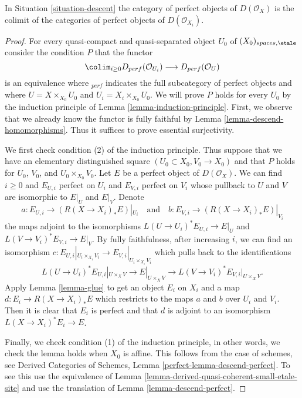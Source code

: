 \begin{lemma}
\label{lemma-perfect-on-limit}
In Situation \ref{situation-descent} the category of perfect
objects of $D(\mathcal{O}_X)$ is the colimit of the categories
of perfect objects of $D(\mathcal{O}_{X_i})$.
\end{lemma}

\begin{proof}
For every quasi-compact and quasi-separated object $U_0$ of
$(X_0)_{spaces, \etale}$ consider the condition $P$ that
the functor
$$
\colim_{i \geq 0} D_{perf}(\mathcal{O}_{U_i})
\longrightarrow
D_{perf}(\mathcal{O}_U)
$$
is an equivalence where ${}_{perf}$ indicates the full subcategory of
perfect objects and where $U = X \times_{X_0} U_0$ and
$U_i = X_i \times_{X_0} U_0$. We will prove $P$ holds for every $U_0$
by the induction principle of Lemma \ref{lemma-induction-principle}.
First, we observe that we already know the functor is fully faithful
by Lemma \ref{lemma-descend-homomorphisms}. Thus it suffices to prove
essential surjectivity.

\medskip\noindent
We first check condition (2) of the induction principle. Thus suppose
that we have an elementary distinguished square
$(U_0 \subset X_0, V_0 \to X_0)$ and that $P$ holds for
$U_0$, $V_0$, and $U_0 \times_{X_0} V_0$. Let $E$ be a perfect object
of $D(\mathcal{O}_X)$. We can find $i \geq 0$ and $E_{U, i}$ perfect on $U_i$
and $E_{V, i}$ perfect on $V_i$ whose pullback to $U$ and $V$ are isomorphic
to $E|_U$ and $E|_V$. Denote
$$
a : E_{U, i} \to (R(X \to X_i)_*E)|_{U_i}
\quad\text{and}\quad
b : E_{V, i} \to (R(X \to X_i)_*E)|_{V_i}
$$
the maps adjoint to the isomorphisms $L(U \to U_i)^*E_{U, i} \to E|_U$
and $L(V \to V_i)^*E_{V, i} \to E|_V$. By fully faithfulness, after
increasing $i$, we can find an isomorphism
$c : E_{U, i}|_{U_i \times_{X_i} V_i} \to E_{V, i}|_{U_i \times_{X_i} V_i}$
which pulls back to the identifications 
$$
L(U \to U_i)^*E_{U, i}|_{U \times_X V} \to E|_{U \times_X V} \to
L(V \to V_i)^*E_{V, i}|_{U \times_X V}.
$$
Apply Lemma \ref{lemma-glue}
to get an object $E_i$ on $X_i$ and a map $d : E_i \to R(X \to X_i)_*E$
which restricts to the maps $a$ and $b$ over $U_i$ and $V_i$.
Then it is clear that $E_i$ is perfect and that
$d$ is adjoint to an isomorphism $L(X \to X_i)^*E_i \to E$.

\medskip\noindent
Finally, we check condition (1) of the induction principle, in other
words, we check the lemma holds when $X_0$ is affine.
This follows from the case of schemes, see
Derived Categories of Schemes, Lemma \ref{perfect-lemma-descend-perfect}.
To see this use the equivalence of
Lemma \ref{lemma-derived-quasi-coherent-small-etale-site}
and use the translation of Lemma \ref{lemma-descend-perfect}.
\end{proof}






